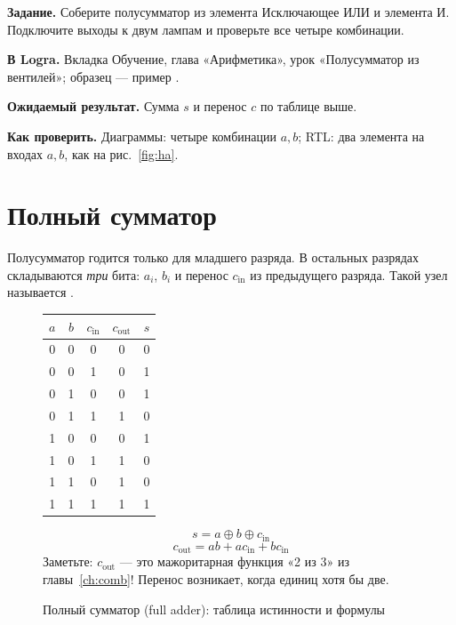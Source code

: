 \begin{diybox}[Полусумматор]
\textbf{Задание.}  Соберите полусумматор из элемента Исключающее ИЛИ и
элемента И.  Подключите выходы к двум лампам и проверьте все четыре
комбинации.

\textbf{В Logra.} Вкладка Обучение, глава «Арифметика», урок
«Полусумматор из вентилей»; образец --- пример .

\textbf{Ожидаемый результат.} Сумма $s$ и перенос $c$ по таблице выше.

\textbf{Как проверить.} Диаграммы: четыре комбинации $a,b$; RTL: два элемента
на входах $a,b$, как на рис.~\ref{fig:ha}.
\end{diybox}

\section{Полный сумматор}

Полусумматор годится только для младшего разряда. В остальных разрядах
складываются \emph{три} бита: $a_i$, $b_i$ и перенос $c_\text{in}$ из
предыдущего разряда. Такой узел называется .

\begin{figure}[H]
\centering
\begin{minipage}{0.38\textwidth}
\centering
\small
\begin{tabular}{ccc|cc}
\toprule
$a$ & $b$ & $c_\text{in}$ & $c_\text{out}$ & $s$ \\
\midrule
0&0&0 & 0&0 \\
0&0&1 & 0&1 \\
0&1&0 & 0&1 \\
0&1&1 & 1&0 \\
1&0&0 & 0&1 \\
1&0&1 & 1&0 \\
1&1&0 & 1&0 \\
1&1&1 & 1&1 \\
\bottomrule
\end{tabular}
\end{minipage}
\begin{minipage}{0.58\textwidth}
\[
  s = a \oplus b \oplus c_\text{in}
\]
\[
  c_\text{out} = ab + ac_\text{in} + bc_\text{in}
\]
\small Заметьте: $c_\text{out}$ --- это мажоритарная функция «2 из 3» из
главы~\ref{ch:comb}! Перенос возникает, когда единиц хотя бы две.
\end{minipage}
\caption{Полный сумматор (full adder): таблица истинности и формулы}
\end{figure}

